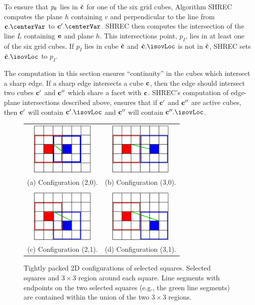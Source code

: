 To ensure that $p_{{\tilde{\mathbf{c}}}}$ lies in ${\tilde{\mathbf{c}}}$ for one of the six grid cubes,
Algorithm SHREC computes the plane $h$ containing $v$
and perpendicular to the line from $\cb.\centerVar$ to $\cb'.\centerVar$.
SHREC then computes the intersection of the line $L$ containing $\mathbf{e}$
and plane $h$.
This intersections point, $p_I$, lies in at least one of the six grid cubes.
If $p_I$ lies in cube ${\tilde{\mathbf{c}}}$ and $\tcb.\isovLoc$ is not in ${\tilde{\mathbf{c}}}$,
SHREC sets $\tcb.\isovLoc$ to $p_I$.

The computation in this section ensures ``continuity'' in the cubes
which intersect a sharp edge.
If a sharp edge intersects a cube $\mathbf{c}$,
then the edge should intersect two cubes $\mathbf{c}'$ and $\mathbf{c}''$
which share a facet with $\mathbf{c}$.
SHREC's computation of edge-plane intersections described above,
ensures that if $\mathbf{c}'$ and $\mathbf{c}''$ are active cubes,
then $\mathbf{c}'$ will contain $\cb'.\isovLoc$ and 
$\mathbf{c}''$ will contain $\cb''.\isovLoc$.


\begin{figure}
\centering
\begin{tabular}{cc}
\includegraphics[width=1.2in]{images/config2D_2_0.eps} \qquad &
\qquad
\includegraphics[width=1.2in]{images/config2D_3_0.eps} \\
(a) Configuration (2,0). & (b) Configuration (3,0). \\
\\
\includegraphics[width=1.2in]{images/config2D_2_1.eps}
\qquad &
\qquad
\includegraphics[width=1.2in]{images/config2D_3_1.eps} \\
(c) Configuration (2,1). & (d) Configuration (3,1).
\end{tabular}
\caption{Tightly packed 2D configurations of selected squares.
Selected squares and $3 \times 3$ region around each square.
Line segments with endpoints on the two selected squares 
(e.g., the green line segments) are contained
within the union of the two $3 \times 3$ regions.}
\label{fig:packed2D}
\end{figure}

